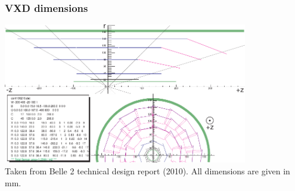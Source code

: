 \documentclass[18pt]{beamer}
\begin{document}
\begin{frame}
  \frametitle{VXD dimensions}
  \includegraphics[width=0.8\textwidth]{figures/vxd_dimensions.pdf}\\
  Taken from Belle 2 technical design report (2010). All dimensions are given in mm.
\end{frame}
\end{document}
